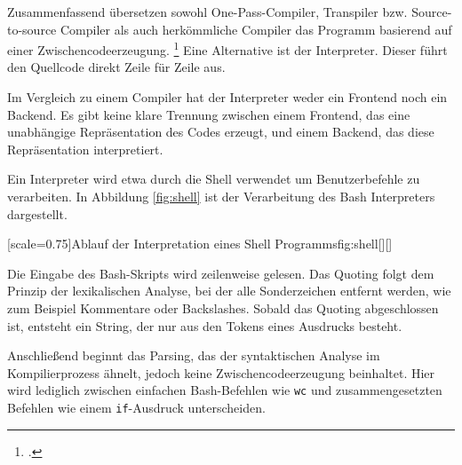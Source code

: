 

Zusammenfassend übersetzen sowohl One-Pass-Compiler, Transpiler bzw. Source-to-source Compiler als auch herkömmliche Compiler das Programm basierend auf einer Zwischencodeerzeugung. \footcite[Vgl. ][S. 18ff. ]{assambly}
Eine Alternative ist der Interpreter. Dieser führt den Quellcode direkt Zeile für Zeile aus.

Im Vergleich zu einem Compiler hat der Interpreter weder ein Frontend noch ein Backend. Es gibt keine klare Trennung zwischen einem Frontend, das eine unabhängige Repräsentation des Codes erzeugt, und einem Backend, das diese Repräsentation interpretiert. 

Ein Interpreter wird etwa durch die Shell verwendet um Benutzerbefehle zu verarbeiten. 
In Abbildung \ref{fig:shell} ist der Verarbeitung des Bash Interpreters dargestellt.


[scale=0.75]{Ablauf der Interpretation eines Shell Programms}{fig:shell}[][]
\pagebreak

Die Eingabe des Bash-Skripts wird zeilenweise gelesen.
Das Quoting folgt dem Prinzip der lexikalischen Analyse, bei der alle Sonderzeichen entfernt werden, wie zum Beispiel Kommentare oder Backslashes. Sobald das Quoting abgeschlossen ist, entsteht ein String, der nur aus den Tokens eines Ausdrucks besteht.

Anschließend beginnt das Parsing, das der syntaktischen Analyse im Kompilierprozess ähnelt, jedoch keine Zwischencodeerzeugung beinhaltet. Hier wird lediglich zwischen einfachen Bash-Befehlen wie \verb+wc+ und zusammengesetzten Befehlen wie einem \verb+if+-Ausdruck unterscheiden.

